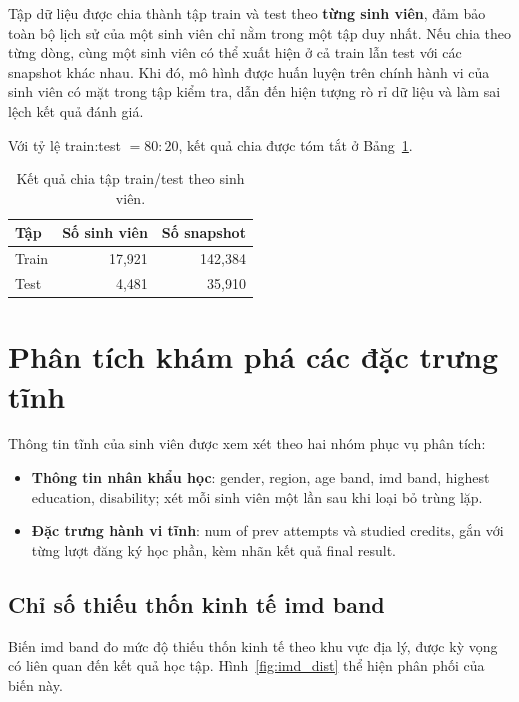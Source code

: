 \documentclass[a4paper]{report}
\newcommand{\code}[1]{{\ttfamily\def\_{\textunderscore\discretionary{}{}{}}#1}}
\def\code#1{#1}%
\def\_{ }%
\begin{document}
Tập dữ liệu được chia thành tập train và test theo
\textbf{từng sinh viên}, đảm bảo toàn bộ lịch sử của một sinh viên chỉ nằm trong
một tập duy nhất. Nếu chia theo từng dòng, cùng một sinh viên có thể xuất hiện ở cả train
lẫn test với các snapshot khác nhau. Khi đó, mô hình được huấn luyện trên chính
hành vi của sinh viên có mặt trong tập kiểm tra, dẫn đến hiện tượng rò rỉ dữ
liệu và làm sai lệch kết quả đánh giá.

Với tỷ lệ train:test $= 80:20$, kết quả chia được tóm tắt ở
Bảng~\ref{tab:split}.

\begin{table}[H]
  \centering
  \caption{Kết quả chia tập train/test theo sinh viên.}
  \label{tab:split}
  \begin{tabular}{lrr}
    \toprule
    \textbf{Tập} & \textbf{Số sinh viên} & \textbf{Số snapshot} \\
    \midrule
    Train & 17{,}921 & 142{,}384 \\
    Test  & 4{,}481  & 35{,}910 \\
    \bottomrule
  \end{tabular}
\end{table}

\section{Phân tích khám phá các đặc trưng tĩnh}

Thông tin tĩnh của sinh viên được xem xét theo hai nhóm phục vụ phân tích:

\begin{itemize}[leftmargin=*]
  \item \textbf{Thông tin nhân khẩu học}: \code{gender}, \code{region},
        \code{age\_band}, \code{imd\_band}, \code{highest\_education},
        \code{disability}; xét mỗi sinh viên một lần sau khi loại bỏ trùng lặp.
  \item \textbf{Đặc trưng hành vi tĩnh}: \code{num\_of\_prev\_attempts} và
        \code{studied\_credits}, gắn với từng lượt đăng ký học phần, kèm nhãn kết
        quả \code{final\_result}.
\end{itemize}

\subsection{Chỉ số thiếu thốn kinh tế \code{imd\_band}}
\label{sec:imd}

Biến \code{imd\_band} đo mức độ thiếu thốn kinh tế theo khu vực địa lý, được kỳ
vọng có liên quan đến kết quả học tập.
Hình~\ref{fig:imd_dist} thể hiện phân phối của biến này.
\end{document}
